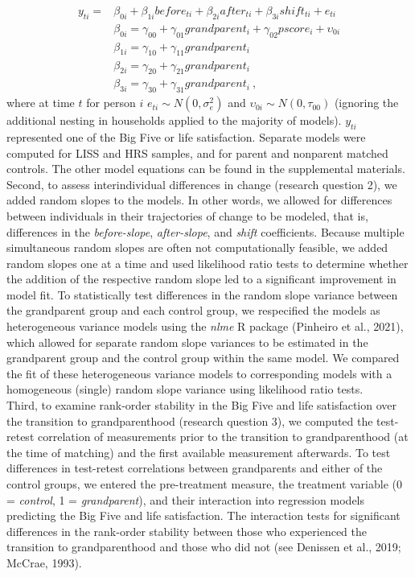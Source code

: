 \documentclass[
  english,
  man,floatsintext]{apa7}
\begin{document}
\begin{equation}
\begin{split}
y_{ti} =& \beta_{0i} + \beta_{1i}before_{ti} + \beta_{2i}after_{ti} + \beta_{3i}shift_{ti} + e_{ti} \\
 & \beta_{0i} = \gamma_{00} + \gamma_{01}grandparent_i + \gamma_{02}pscore_i + \upsilon_{0i} \\
 & \beta_{1i} = \gamma_{10} + \gamma_{11}grandparent_i \\
 & \beta_{2i} = \gamma_{20} + \gamma_{21}grandparent_i \\
 & \beta_{3i} = \gamma_{30} + \gamma_{31}grandparent_i\ ,
\end{split}
\label{eq:mlm}
\end{equation}
where at time \(t\) for person \(i\) \(e_{ti} \sim N(0, \sigma_e^2)\) and \(\upsilon_{0i} \sim N(0, \tau_{00})\) (ignoring the additional nesting in households applied to the majority of models). \(y_{ti}\) represented one of the Big Five or life satisfaction. Separate models were computed for LISS and HRS samples, and for parent and nonparent matched controls. The other model equations can be found in the supplemental materials.\\
Second, to assess interindividual differences in change (research question 2), we added random slopes to the models. In other words, we allowed for differences between individuals in their trajectories of change to be modeled, that is, differences in the \emph{before-slope}, \emph{after-slope}, and \emph{shift} coefficients. Because multiple simultaneous random slopes are often not computationally feasible, we added random slopes one at a time and used likelihood ratio tests to determine whether the addition of the respective random slope led to a significant improvement in model fit. To statistically test differences in the random slope variance between the grandparent group and each control group, we respecified the models as heterogeneous variance models using the \emph{nlme} R package (Pinheiro et al., 2021), which allowed for separate random slope variances to be estimated in the grandparent group and the control group within the same model. We compared the fit of these heterogeneous variance models to corresponding models with a homogeneous (single) random slope variance using likelihood ratio tests.\\
Third, to examine rank-order stability in the Big Five and life satisfaction over the transition to grandparenthood (research question 3), we computed the test-retest correlation of measurements prior to the transition to grandparenthood (at the time of matching) and the first available measurement afterwards. To test differences in test-retest correlations between grandparents and either of the control groups, we entered the pre-treatment measure, the treatment variable (0 = \emph{control}, 1 = \emph{grandparent}), and their interaction into regression models predicting the Big Five and life satisfaction. The interaction tests for significant differences in the rank-order stability between those who experienced the transition to grandparenthood and those who did not (see Denissen et al., 2019; McCrae, 1993).
\end{document}
